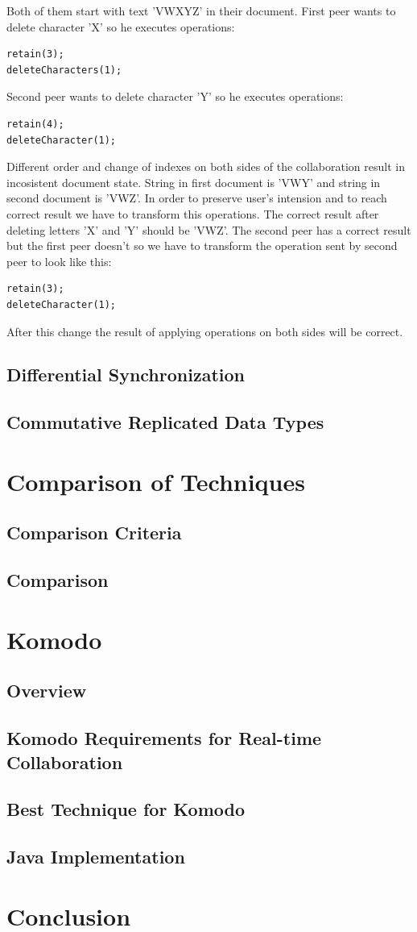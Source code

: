 \documentclass[12pt,oneside]{fithesis2}
\begin{document}
Both of them start with text 'VWXYZ' in their document. First peer wants to delete character 'X' so he executes operations:
\begin{verbatim}
retain(3);
deleteCharacters(1);
\end{verbatim} 
Second peer wants to delete character 'Y' so he executes operations: 
\begin{verbatim}
retain(4);
deleteCharacter(1);
\end{verbatim}
Different order and change of indexes on both sides of the collaboration result in incosistent document state. String in first document is 'VWY' and string in second document is 'VWZ'.  In order to preserve user's intension and to reach correct result we have to transform this operations. The correct result after deleting letters 'X' and 'Y' should be 'VWZ'. The second peer has a correct result but the first peer doesn't so we have to transform the operation sent by second peer to look like this:
\begin{verbatim}
retain(3);
deleteCharacter(1);
\end{verbatim}
After this change the result of applying operations on both sides will be correct.
\section{Differential Synchronization}
\section{Commutative Replicated Data Types}
\chapter{Comparison of Techniques}
\section{Comparison Criteria}
\section{Comparison}
\chapter{Komodo}
\section{Overview}
\section{Komodo Requirements for Real-time Collaboration}
\section{Best Technique for Komodo}
\section{Java Implementation}
\chapter{Conclusion}
 
 
\end{document}
